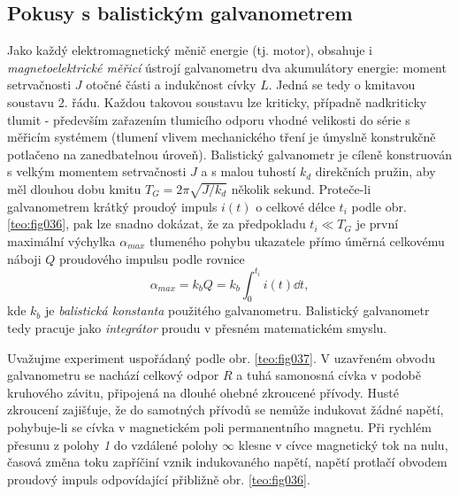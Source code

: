     \subsection{Pokusy s balistickým galvanometrem}
      Jako každý elektromagnetický měnič energie (tj. motor), obsahuje i \emph{magnetoelektrické
      měřicí} ústrojí galvanometru dva akumulátory energie: moment setrvačnosti \(J\) otoč\-né 
      části a indukčnost cívky \(L\). Jedná se tedy o kmitavou soustavu 2. řádu. Každou takovou 
      soustavu lze kriticky, případně nadkriticky tlumit - především zařazením tlumicího odporu 
      vhodné velikosti do série s měřicím systémem (tlumení vlivem mechanického tření je úmyslně 
      konstrukčně potlačeno na zanedbatelnou úroveň). Balistický galvanometr je cíleně konstruován 
      s velkým momentem setrvačnosti \(J\) a s malou tuhostí \(k_d\) direkčních pružin, aby měl 
      dlouhou dobu kmitu \(T_G = 2\pi\sqrt{J/k_d}\) několik sekund. Proteče-li galvanometrem krátký 
      proudoý impuls \(i(t)\) o celkové délce \(t_i\) podle obr. \ref{teo:fig036}, pak lze snadno 
      dokázat, že za předpokladu \(t_i\ll T_G\) je první maximální výchylka \(\alpha_{max}\) 
      tlumeného pohybu ukazatele přímo úměrná celkovému náboji \(Q\) proudového impulsu podle 
      rovnice 
      \begin{equation}\label{TEO:eq103}
        \alpha_{max} = k_b Q = k_b\int_0^{t_i} i(t)\dd{t},
      \end{equation}
      kde \(k_b\) je \emph{balistická konstanta} použitého galvanometru. Balistický galvanometr tedy
      pracuje jako \emph{integrátor} proudu v přesném matematickém smyslu. 
      
  
      Uvažujme experiment uspořádaný podle obr. \ref{teo:fig037}. V uzavřeném obvodu
      galvanometru se nachází celkový odpor \(R\) a tuhá samonosná cívka v podobě kruhového závitu,
      připojená na dlouhé ohebné zkroucené přívody. Husté zkroucení zajišťuje, že do samotných
      přívodů se nemůže indukovat žádné napětí, pohybuje-li se cívka v magnetickém poli 
      permanentního magnetu. Při rychlém přesunu z polohy \emph{1} do vzdálené polohy \(\infty\) 
      klesne v cívce magnetický tok na nulu, časová změna toku zapříčiní vznik indukovaného napětí, 
      napětí protlačí obvodem proudový impuls odpovídající přibližně obr. \ref{teo:fig036}.
      
